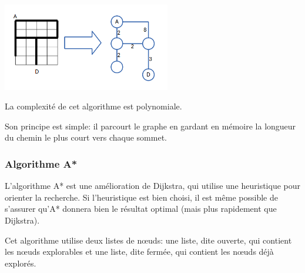     \begin{center}
      \includegraphics[width=0.55\textwidth]{../slides/jeux/GRO_graph1.png}
    \end{center}

    La complexité de cet algorithme est polynomiale.

    Son principe est simple: il parcourt le graphe en gardant en mémoire la
    longueur du chemin le plus court vers chaque sommet.

  \subsubsection{Algorithme A*}
    L'algorithme A* est une amélioration de Dijkstra, qui utilise une heuristique
    pour orienter la recherche.
    Si l'heuristique est bien choisi, il est même possible de s'assurer qu'A*
    donnera bien le résultat optimal (mais plus rapidement que Dijkstra).

    Cet algorithme utilise deux listes de nœuds: une liste, dite ouverte, qui
    contient les nœuds explorables et une liste, dite fermée, qui contient les
    nœuds déjà explorés.


